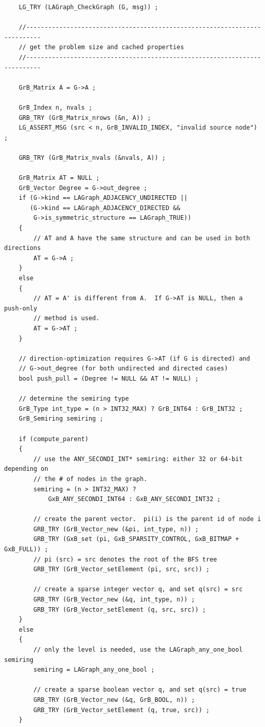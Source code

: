 \begin{verbatim}
    LG_TRY (LAGraph_CheckGraph (G, msg)) ;

    //--------------------------------------------------------------------------
    // get the problem size and cached properties
    //--------------------------------------------------------------------------

    GrB_Matrix A = G->A ;

    GrB_Index n, nvals ;
    GRB_TRY (GrB_Matrix_nrows (&n, A)) ;
    LG_ASSERT_MSG (src < n, GrB_INVALID_INDEX, "invalid source node") ;

    GRB_TRY (GrB_Matrix_nvals (&nvals, A)) ;

    GrB_Matrix AT = NULL ;
    GrB_Vector Degree = G->out_degree ;
    if (G->kind == LAGraph_ADJACENCY_UNDIRECTED ||
       (G->kind == LAGraph_ADJACENCY_DIRECTED &&
        G->is_symmetric_structure == LAGraph_TRUE))
    {
        // AT and A have the same structure and can be used in both directions
        AT = G->A ;
    }
    else
    {
        // AT = A' is different from A.  If G->AT is NULL, then a push-only
        // method is used.
        AT = G->AT ;
    }

    // direction-optimization requires G->AT (if G is directed) and
    // G->out_degree (for both undirected and directed cases)
    bool push_pull = (Degree != NULL && AT != NULL) ;

    // determine the semiring type
    GrB_Type int_type = (n > INT32_MAX) ? GrB_INT64 : GrB_INT32 ;
    GrB_Semiring semiring ;

    if (compute_parent)
    {
        // use the ANY_SECONDI_INT* semiring: either 32 or 64-bit depending on
        // the # of nodes in the graph.
        semiring = (n > INT32_MAX) ?
            GxB_ANY_SECONDI_INT64 : GxB_ANY_SECONDI_INT32 ;

        // create the parent vector.  pi(i) is the parent id of node i
        GRB_TRY (GrB_Vector_new (&pi, int_type, n)) ;
        GRB_TRY (GxB_set (pi, GxB_SPARSITY_CONTROL, GxB_BITMAP + GxB_FULL)) ;
        // pi (src) = src denotes the root of the BFS tree
        GRB_TRY (GrB_Vector_setElement (pi, src, src)) ;

        // create a sparse integer vector q, and set q(src) = src
        GRB_TRY (GrB_Vector_new (&q, int_type, n)) ;
        GRB_TRY (GrB_Vector_setElement (q, src, src)) ;
    }
    else
    {
        // only the level is needed, use the LAGraph_any_one_bool semiring
        semiring = LAGraph_any_one_bool ;

        // create a sparse boolean vector q, and set q(src) = true
        GRB_TRY (GrB_Vector_new (&q, GrB_BOOL, n)) ;
        GRB_TRY (GrB_Vector_setElement (q, true, src)) ;
    }


\end{verbatim}
